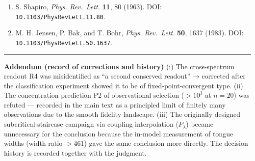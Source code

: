 \documentclass[
  a4paper,
]{article}
\providecommand{\tightlist}{%
  \setlength{\itemsep}{0pt}\setlength{\parskip}{0pt}}
\begin{document}
\begin{enumerate}
\def\labelenumi{\arabic{enumi}.}
\setcounter{enumi}{11}
\tightlist
\item
  S. Shapiro, \emph{Phys. Rev.~Lett.} \textbf{11}, 80 (1963). DOI:
  \texttt{10.1103/PhysRevLett.11.80}.
\item
  M. H. Jensen, P. Bak, and T. Bohr, \emph{Phys. Rev.~Lett.}
  \textbf{50}, 1637 (1983). DOI: \texttt{10.1103/PhysRevLett.50.1637}.
\end{enumerate}

\begin{center}\rule{0.5\linewidth}{0.5pt}\end{center}

\textbf{Addendum (record of corrections and history)} (i) The
cross-spectrum readout R4 was misidentified as ``a second conserved
readout'' → corrected after the classification experiment showed it to
be of fixed-point-convergent type. (ii) The concentration prediction P2
of observational selection (\(>10^3\) at \(n=20\)) was refuted ---
recorded in the main text as a principled limit of finitely many
observations due to the smooth fidelity landscape. (iii) The originally
designed subcritical-staircase campaign via coupling interpolation
(\(P_\lambda\)) became unnecessary for the conclusion because the
in-model measurement of tongue widths (width ratio \(>461\)) gave the
same conclusion more directly. The decision history is recorded together
with the judgment.
\end{document}
